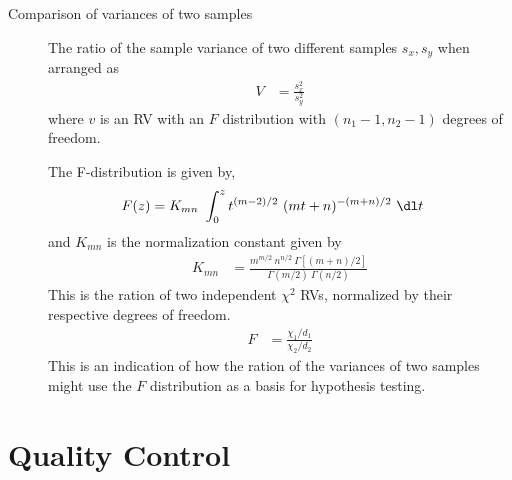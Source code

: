 \begin{description}
    \item[Comparison of variances of two samples] The ratio of the sample variance of
          two different samples $ s_x, s_y $ when arranged as
          \begin{align}
              V & = \frac{s_x^2}{s_y^2}
          \end{align}
          where $ v $ is an RV with an $ F $ distribution with $ (n_1-1, n_2-1) $
          degrees of freedom. \par
          The F-distribution is given by,
          \begin{align}
              F(z) & = K_{mn}\ \int_{0}^{z} t^{(m-2)/2}\ (mt + n)^{-(m+n)/2}\ \dl t
          \end{align}
          and $ K_{mn} $ is the normalization constant given by
          \begin{align}
              K_{mn} & = \frac{m^{m/2}\ n^{n/2}\ \Gamma[(m+n)/2]}
              {\Gamma(m/2)\ \Gamma(n/2)}
          \end{align}
          This is the ration of two independent $ \chi^2 $ RVs, normalized by their
          respective degrees of freedom.
          \begin{align}
              F & = \frac{\chi_1 / d_1}{\chi_2 / d_2}
          \end{align}
          This is an indication of how the ration of the variances of two samples might
          use the $ F $ distribution as a basis for hypothesis testing.

\end{description}

\section{Quality Control}

